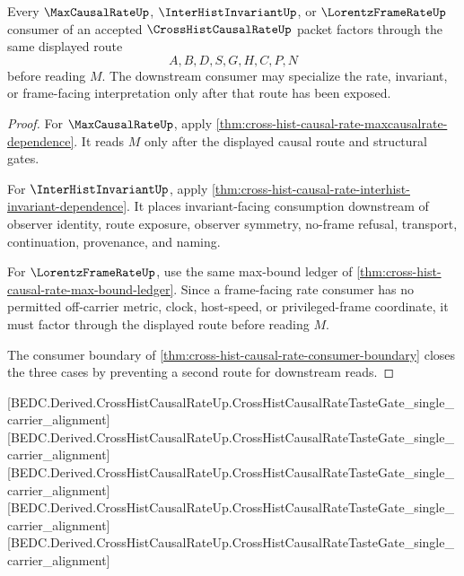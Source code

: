 \begin{theorem}
\label{thm:cross-hist-causal-rate-downstream-factorization}
Every $\MaxCausalRateUp$, $\InterHistInvariantUp$, or $\LorentzFrameRateUp$ consumer of an accepted $\CrossHistCausalRateUp$ packet factors through the same displayed route
$$
A,B,D,S,G,H,C,P,N
$$
before reading $M$. The downstream consumer may specialize the rate, invariant, or frame-facing interpretation only after that route has been exposed.
\end{theorem}
\begin{proof}
For $\MaxCausalRateUp$, apply \autoref{thm:cross-hist-causal-rate-maxcausalrate-dependence}. It reads $M$ only after the displayed causal route and structural gates.

For $\InterHistInvariantUp$, apply \autoref{thm:cross-hist-causal-rate-interhist-invariant-dependence}. It places invariant-facing consumption downstream of observer identity, route exposure, observer symmetry, no-frame refusal, transport, continuation, provenance, and naming.

For $\LorentzFrameRateUp$, use the same max-bound ledger of \autoref{thm:cross-hist-causal-rate-max-bound-ledger}. Since a frame-facing rate consumer has no permitted off-carrier metric, clock, host-speed, or privileged-frame coordinate, it must factor through the displayed route before reading $M$.

The consumer boundary of \autoref{thm:cross-hist-causal-rate-consumer-boundary} closes the three cases by preventing a second route for downstream reads.
\end{proof}



[BEDC.Derived.CrossHistCausalRateUp.CrossHistCausalRateTasteGate\_single\_carrier\_alignment]
[BEDC.Derived.CrossHistCausalRateUp.CrossHistCausalRateTasteGate\_single\_carrier\_alignment]
[BEDC.Derived.CrossHistCausalRateUp.CrossHistCausalRateTasteGate\_single\_carrier\_alignment]
[BEDC.Derived.CrossHistCausalRateUp.CrossHistCausalRateTasteGate\_single\_carrier\_alignment]
[BEDC.Derived.CrossHistCausalRateUp.CrossHistCausalRateTasteGate\_single\_carrier\_alignment]

